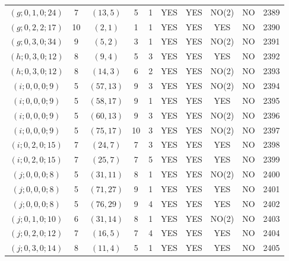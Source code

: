 \begin{longtable}{|c|c|c|c|c|c|c|c|c|c|}
$(g; 0, 1, 0; 24)$ & 7 & $(13, 5)$ & 5 & 1 & YES & YES & NO(2) & NO & 2389\\
$(g; 0, 2, 2; 17)$ & 10 & $(2, 1)$ & 1 & 1 & YES & YES & YES & NO & 2390\\
$(g; 0, 3, 0; 34)$ & 9 & $(5, 2)$ & 3 & 1 & YES & YES & NO(2) & NO & 2391\\
$(h; 0, 3, 0; 12)$ & 8 & $(9, 4)$ & 5 & 3 & YES & YES & YES & NO & 2392\\
$(h; 0, 3, 0; 12)$ & 8 & $(14, 3)$ & 6 & 2 & YES & YES & NO(2) & NO & 2393\\
$(i; 0, 0, 0; 9)$ & 5 & $(57, 13)$ & 9 & 3 & YES & YES & NO(2) & NO & 2394\\
$(i; 0, 0, 0; 9)$ & 5 & $(58, 17)$ & 9 & 1 & YES & YES & YES & NO & 2395\\
$(i; 0, 0, 0; 9)$ & 5 & $(60, 13)$ & 9 & 3 & YES & YES & NO(2) & NO & 2396\\
$(i; 0, 0, 0; 9)$ & 5 & $(75, 17)$ & 10 & 3 & YES & YES & NO(2) & NO & 2397\\
$(i; 0, 2, 0; 15)$ & 7 & $(24, 7)$ & 7 & 3 & YES & YES & YES & NO & 2398\\
$(i; 0, 2, 0; 15)$ & 7 & $(25, 7)$ & 7 & 5 & YES & YES & YES & NO & 2399\\
$(j; 0, 0, 0; 8)$ & 5 & $(31, 11)$ & 8 & 1 & YES & YES & NO(2) & NO & 2400\\
$(j; 0, 0, 0; 8)$ & 5 & $(71, 27)$ & 9 & 1 & YES & YES & YES & NO & 2401\\
$(j; 0, 0, 0; 8)$ & 5 & $(76, 29)$ & 9 & 4 & YES & YES & YES & NO & 2402\\
$(j; 0, 1, 0; 10)$ & 6 & $(31, 14)$ & 8 & 1 & YES & YES & NO(2) & NO & 2403\\
$(j; 0, 2, 0; 12)$ & 7 & $(16, 5)$ & 7 & 4 & YES & YES & YES & NO & 2404\\
$(j; 0, 3, 0; 14)$ & 8 & $(11, 4)$ & 5 & 1 & YES & YES & YES & NO & 2405
\end{longtable}
